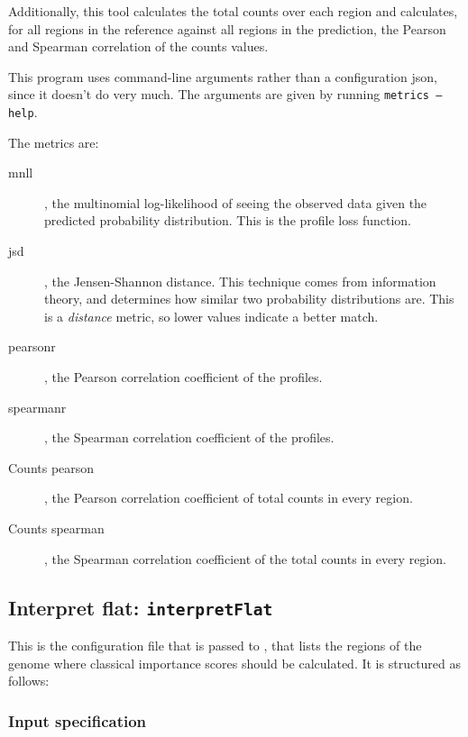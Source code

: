 \documentclass{article}
\begin{document}
Additionally, this tool calculates the total counts over each region and calculates,
for all regions in the reference against all regions in the prediction, the Pearson
and Spearman correlation of the counts values.

This program uses command-line arguments rather than a configuration json,
since it doesn't do very much. The arguments are given by running \texttt{metrics --help}.

The metrics are:
\begin{description}
    \item [mnll], the multinomial log-likelihood of seeing the observed data given
        the predicted probability distribution. This is the profile loss function.
    \item [jsd], the Jensen-Shannon distance. This technique comes from information theory,
        and determines how similar two probability distributions are.
        This is a \emph{distance} metric, so lower values indicate a better match.
    \item [pearsonr], the Pearson correlation coefficient of the profiles.
    \item [spearmanr], the Spearman correlation coefficient of the profiles.
    \item [Counts pearson], the Pearson correlation coefficient of total counts in every region.
    \item [Counts spearman], the Spearman correlation coefficient of the total counts in every region.
\end{description}


\newpage

\subsection{Interpret flat: \texttt{interpretFlat}}\label{prog:interpretFlat}

This is the configuration file that is passed to , that lists the regions of
the genome where classical importance scores should be calculated. It is structured as follows:

\subsubsection{Input specification}


\end{document}
